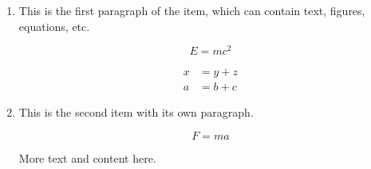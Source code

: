 \documentclass{article}
\begin{document}
\begin{enumerate}[label=(\alph*), left=0pt, itemsep=10pt]
    \item \begin{minipage}[t]{\linewidth}
        This is the first paragraph of the item, which can contain text, figures, equations, etc.

        \begin{equation}
            E=mc^2
        \end{equation}

        \begin{align}
            x &= y + z \\
            a &= b + c
        \end{align}

    \end{minipage}
    
    \item \begin{minipage}[t]{\linewidth}
        This is the second item with its own paragraph.

        \begin{equation}
            F=ma
        \end{equation}

        More text and content here.
    \end{minipage}
\end{enumerate}
\end{document}
